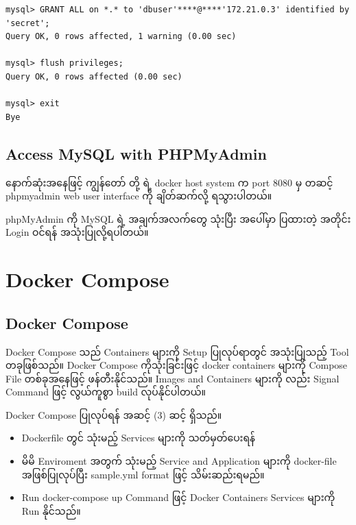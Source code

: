 \begin{verbatim}
mysql> GRANT ALL on *.* to 'dbuser'****@****'172.21.0.3' identified by 'secret';
Query OK, 0 rows affected, 1 warning (0.00 sec)

mysql> flush privileges;
Query OK, 0 rows affected (0.00 sec)

mysql> exit
Bye
\end{verbatim}

\hypertarget{access-mysql-with-phpmyadmin-1}{%
\subsection{Access MySQL with
PHPMyAdmin}\label{access-mysql-with-phpmyadmin-1}}

နောက်ဆုံးအနေဖြင့် ကျွန်တော် တို့ ရဲ့ docker host system က port 8080 မှ
တဆင့် phpmyadmin web user interface ကို ချိတ်ဆက်လို့ ရသွားပါတယ်။

phpMyAdmin ကို MySQL ရဲ့ အချက်အလက်တွေ သုံးပြီး အပေါ်မှာ ပြထားတဲ့ အတိုင်း
Login ဝင်ရန် အသုံးပြုလို့ရပါတယ်။

\pagebreak

\hypertarget{docker-compose-2}{%
\section{Docker Compose}\label{docker-compose-2}}

\hypertarget{docker-compose-3}{%
\subsection{Docker Compose}\label{docker-compose-3}}

Docker Compose သည် Containers များကို Setup ပြုလုပ်ရာတွင် အသုံးပြုသည့်
Tool တခုဖြစ်သည်။ Docker Compose ကိုသုံးခြင်းဖြင့် docker containers
များကို Compose File တစ်ခုအနေဖြင့် ဖန်တီးနိုင်သည်။ Images and Containers
များကို လည်း Signal Command ဖြင့် လွယ်ကူစွာ build လုပ်နိုင်ပါတယ်။

Docker Compose ပြုလုပ်ရန် အဆင့် (3) ဆင့် ရှိသည်။

\begin{itemize}
\tightlist
\item
  Dockerfile တွင် သုံးမည့် Services များကို သတ်မှတ်ပေးရန်
\item
  မိမိ Enviroment အတွက် သုံးမည့် Service and Application များကို
  docker-file အဖြစ်ပြုလုပ်ပြီး sample.yml format ဖြင့် သိမ်းဆည်းရမည်။
\item
  Run docker-compose up Command ဖြင့် Docker Containers Services များကို
  Run နိုင်သည်။
\end{itemize}

